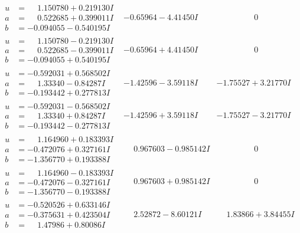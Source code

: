 \documentclass[1p]{elsarticle_modified}
\theoremstyle{definition}
\begin{document}
$$\begin{array}{c|c|c}
\begin{aligned}
u &= \phantom{-}1.150780 + 0.219130 I \\
a &= \phantom{-}0.522685 + 0.399011 I \\
b &= -0.094055 - 0.540195 I\end{aligned}
 & -0.65964 - 4.41450 I & \phantom{-0.000000 } 0 \\ \hline\begin{aligned}
u &= \phantom{-}1.150780 - 0.219130 I \\
a &= \phantom{-}0.522685 - 0.399011 I \\
b &= -0.094055 + 0.540195 I\end{aligned}
 & -0.65964 + 4.41450 I & \phantom{-0.000000 } 0 \\ \hline\begin{aligned}
u &= -0.592031 + 0.568502 I \\
a &= \phantom{-}1.33340 - 0.84287 I \\
b &= -0.193442 + 0.277813 I\end{aligned}
 & -1.42596 - 3.59118 I & -1.75527 + 3.21770 I \\ \hline\begin{aligned}
u &= -0.592031 - 0.568502 I \\
a &= \phantom{-}1.33340 + 0.84287 I \\
b &= -0.193442 - 0.277813 I\end{aligned}
 & -1.42596 + 3.59118 I & -1.75527 - 3.21770 I \\ \hline\begin{aligned}
u &= \phantom{-}1.164960 + 0.183393 I \\
a &= -0.472076 + 0.327161 I \\
b &= -1.356770 + 0.193388 I\end{aligned}
 & \phantom{-}0.967603 - 0.985142 I & \phantom{-0.000000 } 0 \\ \hline\begin{aligned}
u &= \phantom{-}1.164960 - 0.183393 I \\
a &= -0.472076 - 0.327161 I \\
b &= -1.356770 - 0.193388 I\end{aligned}
 & \phantom{-}0.967603 + 0.985142 I & \phantom{-0.000000 } 0 \\ \hline\begin{aligned}
u &= -0.520526 + 0.633146 I \\
a &= -0.375631 + 0.423504 I \\
b &= \phantom{-}1.47986 + 0.80086 I\end{aligned}
 & \phantom{-}2.52872 - 8.60121 I & \phantom{-}1.83866 + 3.84455 I \\ \hline\begin{aligned}

\end{aligned}
\end{array}$$
\end{document}
